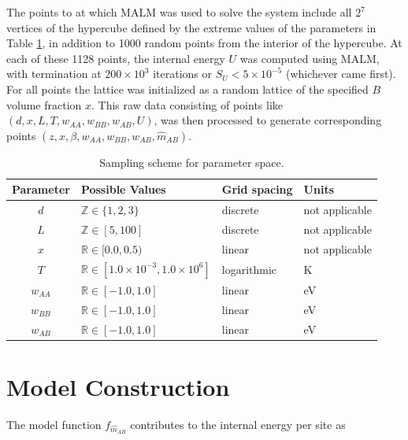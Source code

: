 \documentclass[10pt]{article}
\begin{document}
The points to at which MALM was used to solve the system include all $2^7$ vertices of the hypercube defined by the extreme values of the parameters in Table \ref{tbl:param_ranges}, in addition to 1000 random points from the interior of the hypercube.
At each of these 1128 points, the internal energy $U$ was computed using MALM, with termination at $200 \times 10^3$ iterations or $S_{U} < 5 \times 10^{-5}$ (whichever came first).
For all points the lattice was initialized as a random lattice of the specified $B$ volume fraction $x$.
This raw data consisting of points like $(d,x,L,T,w_{AA},w_{BB},w_{AB},U)$, was then processed to generate corresponding points $(z,x,\beta,w_{AA},w_{BB},w_{AB},\hat{m}_{AB})$.

\begin{table}[h!]
    \caption{Sampling scheme for parameter space.}
    \begin{center}
    \begin{tabular}{c | l | l | l} 
        \hline
        Parameter & Possible Values & Grid spacing & Units \\  \hline
        $d$ & $\mathbb{Z} \in \{1,2,3\}$ & discrete & not applicable \\ \hline
        $L$ & $\mathbb{Z} \in [5,100]$ & discrete & not applicable \\ \hline
        $x$ & $\mathbb{R} \in [0.0,0.5)$ & linear & not applicable \\ \hline
        $T$ & $\mathbb{R} \in [1.0 \times 10^{-3},1.0 \times 10^6]$ & logarithmic & K \\ \hline
        $w_{AA}$ & $\mathbb{R} \in [-1.0, 1.0]$ & linear & eV \\ \hline
        $w_{BB}$ & $\mathbb{R} \in [-1.0, 1.0]$ & linear & eV \\ \hline
        $w_{AB}$ & $\mathbb{R} \in [-1.0, 1.0]$ & linear & eV
        \label{tbl:param_ranges}
    \end{tabular}
    \end{center}
\end{table}


\section{Model Construction}
The model function $f_{\hat{m}_{AB}}$ contributes to the internal energy per site as
\end{document}

